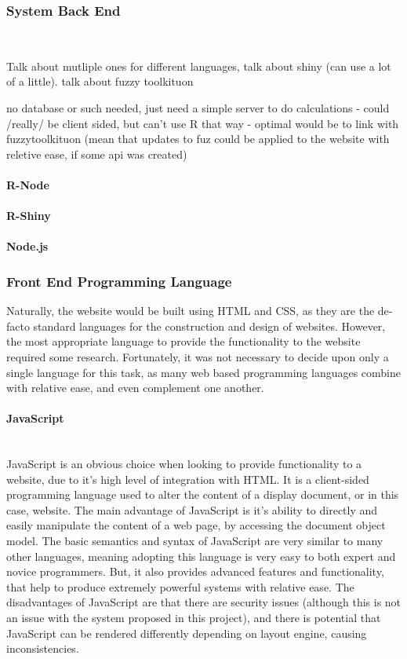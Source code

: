 \subsubsection{System Back End}\ \\
{\color{red}
Talk about mutliple ones for different languages, talk about shiny (can use a lot of a little). talk about fuzzy toolkituon

no database or such needed, just need a simple server to do calculations - could /really/ be client sided, but can't use R that way - optimal would be to link with fuzzytoolkituon (mean that updates to fuz could be applied to the website with reletive ease, if some api was created)
}

\paragraph{R-Node}
\paragraph{R-Shiny}
\paragraph{Node.js}


\subsubsection{Front End Programming Language}
Naturally, the website would be built using HTML and CSS, as they are the de-facto standard languages for the construction and design of websites. However, the most appropriate language to provide the functionality to the website required some research. Fortunately, it was not necessary to decide upon only a single language for this task, as many web based programming languages combine with relative ease, and even complement one another. 

\paragraph{JavaScript}\ \\
JavaScript is an obvious choice when looking to provide functionality to a website, due to it's high level of integration with HTML. It is a client-sided programming language used to alter the content of a display document, or in this case, website. The main advantage of JavaScript is it's ability to directly and easily manipulate the content of a web page, by accessing the document object model. The basic semantics and syntax of JavaScript are very similar to many other languages, meaning adopting this language is very easy to both expert and novice programmers. But, it also provides advanced features and functionality, that help to produce extremely powerful systems with relative ease. The disadvantages of JavaScript are that there are security issues (although this is not an issue with the system proposed in this project), and there is potential that JavaScript can be rendered differently depending on layout engine, causing inconsistencies.


